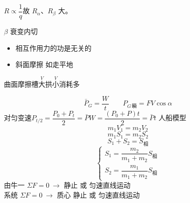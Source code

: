 \begin{keybox}
$R\propto\dfrac1q$\quad 故 $R_\alpha$、$R_\beta$ 大。
\end{keybox}
\noindent $\beta$ 衰变\quad 内切
\begin{itemize}
\item 相互作用力的功是无关的
\item 斜面摩擦 如走平地
\end{itemize}
\begin{keybox}
曲面摩擦\quad 槽$\overset{V}{\text{大}}$拱$\overset{V}{\text{小}}$消耗多
\end{keybox}
\[ \bar P_G=\frac Wt\qquad P_{G\,\text{瞬}}=FV\cos\alpha \]
\noindent 对匀变速\quad $P_{t/2}=\dfrac{P_0+P_t}{2}=\bar P$\qquad $W=\dfrac{(P_0+P)t}{2}=\bar Pt$
\noindent 人船模型
\[ m_1V_1=m_2V_2 \]
\[ m_1S_1=m_2S_2 \]
\[ S_1+S_2=S_{\text{相}} \]
\[ \begin{cases} S_1=\dfrac{m_2}{m_1+m_2}S_{\text{相}}\\[6pt] S_2=\dfrac{m_1}{m_1+m_2}S_{\text{相}}\end{cases} \]
\noindent 由牛一 $\Sigma F=0\ \longrightarrow$ 静止 或 匀速直线运动 \\
系统 $\Sigma F=0\ \longrightarrow$ 质心 静止 或 匀速直线运动
